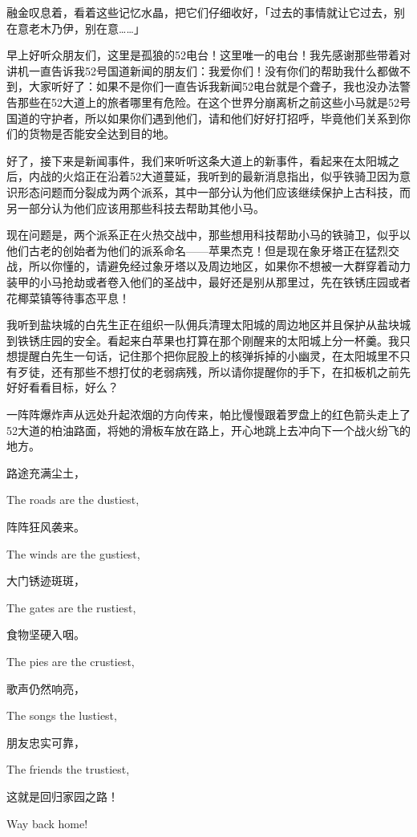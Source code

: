 融金叹息着，看着这些记忆水晶，把它们仔细收好，「过去的事情就让它过去，别在意老木乃伊，别在意……」

\horizonline


{\rt 早上好听众朋友们，这里是孤狼的52电台！这里唯一的电台！我先感谢那些带着对讲机一直告诉我52号国道新闻的朋友们：我爱你们！没有你们的帮助我什么都做不到，大家听好了：如果不是你们一直告诉我新闻52电台就是个聋子，我也没办法警告那些在52大道上的旅者哪里有危险。在这个世界分崩离析之前这些小马就是52号国道的守护者，所以如果你们遇到他们，请和他们好好打招呼，毕竟他们关系到你们的货物是否能安全达到目的地。

好了，接下来是新闻事件，我们来听听这条大道上的新事件，看起来在太阳城之后，内战的火焰正在沿着52大道蔓延，我听到的最新消息指出，似乎铁骑卫因为意识形态问题而分裂成为两个派系，其中一部分认为他们应该继续保护上古科技，而另一部分认为他们应该用那些科技去帮助其他小马。

现在问题是，两个派系正在火热交战中，那些想用科技帮助小马的铁骑卫，似乎以他们古老的创始者为他们的派系命名——苹果杰克！但是现在象牙塔正在猛烈交战，所以你懂的，请避免经过象牙塔以及周边地区，如果你不想被一大群穿着动力装甲的小马抢劫或者卷入他们的圣战中，最好还是别从那里过，先在铁锈庄园或者花椰菜镇等待事态平息！

我听到盐块城的白先生正在组织一队佣兵清理太阳城的周边地区并且保护从盐块城到铁锈庄园的安全。看起来白苹果也打算在那个刚醒来的太阳城上分一杯羹。我只想提醒白先生一句话，记住那个把你屁股上的核弹拆掉的小幽灵，在太阳城里不只有歹徒，还有那些不想打仗的老弱病残，所以请你提醒你的手下，在扣板机之前先好好看看目标，好么？}

一阵阵爆炸声从远处升起浓烟的方向传来，帕比慢慢跟着罗盘上的红色箭头走上了52大道的柏油路面，将她的滑板车放在路上，开心地跳上去冲向下一个战火纷飞的地方。

\begin{song}
路途充满尘土，

The roads are the dustiest,

\medskip

阵阵狂风袭来。

The winds are the gustiest,

\medskip

大门锈迹斑斑，

The gates are the rustiest,

\medskip

食物坚硬入咽。

The pies are the crustiest,

\medskip

歌声仍然响亮，

The songs the lustiest,

\medskip

朋友忠实可靠，

The friends the trustiest,

\medskip

这就是回归家园之路！

Way back home!
\end{song}

